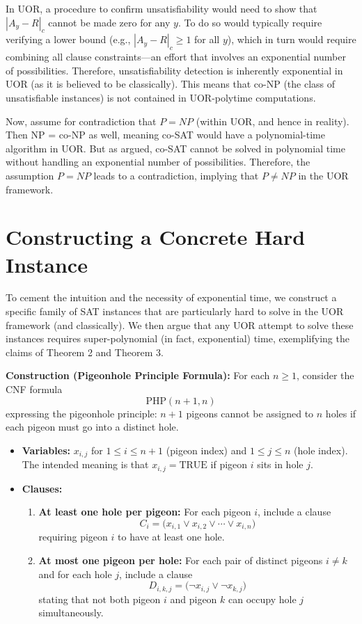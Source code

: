 \documentclass{article}
\begin{document}
In UOR, a procedure to confirm unsatisfiability would need to show that $|A_y - R|_c$ cannot be made zero for any $y$. To do so would typically require verifying a lower bound (e.g., $|A_y - R|_c \ge 1$ for all $y$), which in turn would require combining all clause constraints—an effort that involves an exponential number of possibilities. Therefore, unsatisfiability detection is inherently exponential in UOR (as it is believed to be classically). This means that co-NP (the class of unsatisfiable instances) is not contained in UOR-polytime computations.

Now, assume for contradiction that $P=NP$ (within UOR, and hence in reality). Then NP = co-NP as well, meaning co-SAT would have a polynomial-time algorithm in UOR. But as argued, co-SAT cannot be solved in polynomial time without handling an exponential number of possibilities. Therefore, the assumption $P=NP$ leads to a contradiction, implying that $P \neq NP$ in the UOR framework.

\section{Constructing a Concrete Hard Instance}

To cement the intuition and the necessity of exponential time, we construct a specific family of SAT instances that are particularly hard to solve in the UOR framework (and classically). We then argue that any UOR attempt to solve these instances requires super-polynomial (in fact, exponential) time, exemplifying the claims of Theorem 2 and Theorem 3.

\medskip
\textbf{Construction (Pigeonhole Principle Formula):} For each $n\ge 1$, consider the CNF formula
\[
\mathrm{PHP}(n+1,n)
\]
expressing the pigeonhole principle: $n+1$ pigeons cannot be assigned to $n$ holes if each pigeon must go into a distinct hole.
\begin{itemize}
    \item \textbf{Variables:} $x_{i,j}$ for $1 \le i \le n+1$ (pigeon index) and $1 \le j \le n$ (hole index). The intended meaning is that $x_{i,j}=\text{TRUE}$ if pigeon $i$ sits in hole $j$.
    \item \textbf{Clauses:}
    \begin{enumerate}
        \item \textbf{At least one hole per pigeon:} For each pigeon $i$, include a clause 
        \[
        C_i = \bigl(x_{i,1} \vee x_{i,2} \vee \cdots \vee x_{i,n}\bigr)
        \]
        requiring pigeon $i$ to have at least one hole.
        \item \textbf{At most one pigeon per hole:} For each pair of distinct pigeons $i \neq k$ and for each hole $j$, include a clause 
        \[
        D_{i,k,j} = \bigl(\neg x_{i,j} \vee \neg x_{k,j}\bigr)
        \]
        stating that not both pigeon $i$ and pigeon $k$ can occupy hole $j$ simultaneously.
    \end{enumerate}
\end{itemize}
\end{document}
